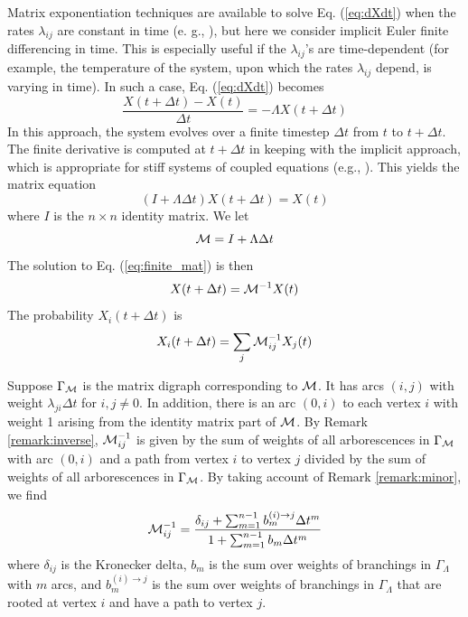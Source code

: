 \documentclass{article}
\begin{document}
Matrix exponentiation techniques are available to solve Eq. (\ref{eq:dXdt}) when the rates $\lambda_{ij}$ are constant in time (e. g., \cite{doi:10.1137/09074721X}), but here we consider implicit Euler finite differencing in time.  This is especially useful if the $\lambda_{ij}$'s are time-dependent (for example, the temperature of the system, upon which the rates $\lambda_{ij}$ depend, is varying in time).  In such a case, Eq. (\ref{eq:dXdt}) becomes
\begin{equation}
    \frac{X(t + \Delta t) - X(t)}{\Delta t} = -\Lambda X(t + \Delta t)
    \label{eq:finite}
\end{equation}
In this approach, the system evolves over a finite timestep $\Delta t$ from $t$ to $t + \Delta t$.  The finite derivative is computed at $t + \Delta t$ in keeping with the implicit approach, which is appropriate for stiff systems of coupled equations (e.g., \cite{2006NuPhA.777..188H}).  This yields the matrix equation
\begin{equation}
    \left(I + \Lambda \Delta t\right)X(t + \Delta t) = X(t)
    \label{eq:finite_mat}
\end{equation}
where $I$ is the $n \times n$ identity matrix.
We let
\begin{equation}
    {\cal M} = I + \Lambda \Delta t
    \label{eq:cal_M}
\end{equation}
The solution to Eq. (\ref{eq:finite_mat}) is then
\begin{equation}
    X(t + \Delta t) = {\cal M}^{-1} X(t)
    \label{eq:finite_sol}
\end{equation} 
The probability $X_i(t + \Delta t)$ is
\begin{equation}
    X_i(t + \Delta t) = \sum_j {\cal M}_{ij}^{-1} X_j(t)
    \label{eq:X_tdt}
\end{equation}

Suppose $\Gamma_{\cal M}$ is the matrix digraph corresponding to ${\cal M}$.  It has arcs $(i,j)$ with weight $\lambda_{ji} \Delta t$ for $i, j \ne 0$.  In addition, there is an arc $(0, i)$ to each vertex $i$ with weight 1 arising from the identity matrix part of ${\cal M}$.  By Remark \ref{remark:inverse}, ${\cal M}_{ij}^{-1}$ is given by the sum of weights of all arborescences in $\Gamma_{\cal M}$ with arc $(0, i)$ and a path from vertex $i$ to vertex $j$ divided by the sum of weights of all arborescences in $\Gamma_{\cal M}$.  By taking account of Remark \ref{remark:minor}, we find
\begin{equation}
    {\cal M}_{ij}^{-1} = \frac{\delta_{ij} + \sum_{m=1}^{n-1} b_m^{(i)\to j} \Delta t^m}{1 + \sum_{m=1}^{n-1} b_m \Delta t^m}
    \label{eq:mij_dt}
\end{equation}
where $\delta_{ij}$ is the Kronecker delta, $b_m$ is the sum over weights of branchings in $\Gamma_\Lambda$ with $m$ arcs, and $b_m^{(i)\to j}$ is the sum over weights of branchings in $\Gamma_\Lambda$ that are rooted at vertex $i$ and have a path to vertex $j$.
\end{document}
